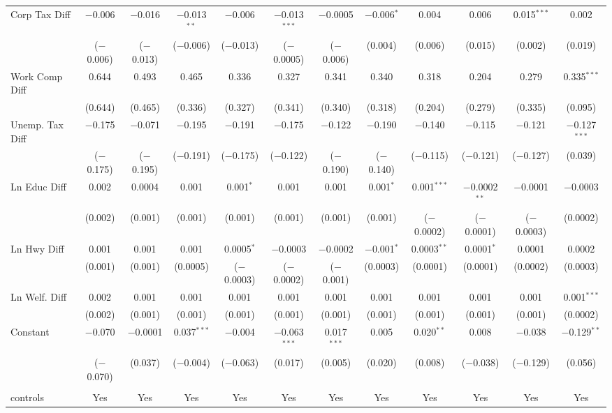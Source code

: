 \begin{table}[!htbp]
\begin{tabular}{@{\extracolsep{5pt}}lccccccccccc}
  Corp Tax Diff & $-$0.006 & $-$0.016 & $-$0.013$^{**}$ & $-$0.006 & $-$0.013$^{***}$ & $-$0.0005 & $-$0.006$^{*}$ & 0.004 & 0.006 & 0.015$^{***}$ & 0.002 \\ 
  & ($-$0.006) & ($-$0.013) & ($-$0.006) & ($-$0.013) & ($-$0.0005) & ($-$0.006) & (0.004) & (0.006) & (0.015) & (0.002) & (0.019) \\ 
  Work Comp Diff & 0.644 & 0.493 & 0.465 & 0.336 & 0.327 & 0.341 & 0.340 & 0.318 & 0.204 & 0.279 & 0.335$^{***}$ \\ 
  & (0.644) & (0.465) & (0.336) & (0.327) & (0.341) & (0.340) & (0.318) & (0.204) & (0.279) & (0.335) & (0.095) \\ 
  Unemp. Tax Diff & $-$0.175 & $-$0.071 & $-$0.195 & $-$0.191 & $-$0.175 & $-$0.122 & $-$0.190 & $-$0.140 & $-$0.115 & $-$0.121 & $-$0.127$^{***}$ \\ 
  & ($-$0.175) & ($-$0.195) & ($-$0.191) & ($-$0.175) & ($-$0.122) & ($-$0.190) & ($-$0.140) & ($-$0.115) & ($-$0.121) & ($-$0.127) & (0.039) \\ 
  Ln Educ Diff & 0.002 & 0.0004 & 0.001 & 0.001$^{*}$ & 0.001 & 0.001 & 0.001$^{*}$ & 0.001$^{***}$ & $-$0.0002$^{**}$ & $-$0.0001 & $-$0.0003 \\ 
  & (0.002) & (0.001) & (0.001) & (0.001) & (0.001) & (0.001) & (0.001) & ($-$0.0002) & ($-$0.0001) & ($-$0.0003) & (0.0002) \\ 
  Ln Hwy Diff & 0.001 & 0.001 & 0.001 & 0.0005$^{*}$ & $-$0.0003 & $-$0.0002 & $-$0.001$^{*}$ & 0.0003$^{**}$ & 0.0001$^{*}$ & 0.0001 & 0.0002 \\ 
  & (0.001) & (0.001) & (0.0005) & ($-$0.0003) & ($-$0.0002) & ($-$0.001) & (0.0003) & (0.0001) & (0.0001) & (0.0002) & (0.0003) \\ 
  Ln Welf. Diff & 0.002 & 0.001 & 0.001 & 0.001 & 0.001 & 0.001 & 0.001 & 0.001 & 0.001 & 0.001 & 0.001$^{***}$ \\ 
  & (0.002) & (0.001) & (0.001) & (0.001) & (0.001) & (0.001) & (0.001) & (0.001) & (0.001) & (0.001) & (0.0002) \\ 
  Constant & $-$0.070 & $-$0.0001 & 0.037$^{***}$ & $-$0.004 & $-$0.063$^{***}$ & 0.017$^{***}$ & 0.005 & 0.020$^{**}$ & 0.008 & $-$0.038 & $-$0.129$^{**}$ \\ 
  & ($-$0.070) & (0.037) & ($-$0.004) & ($-$0.063) & (0.017) & (0.005) & (0.020) & (0.008) & ($-$0.038) & ($-$0.129) & (0.056) \\ 
 \hline \\[-1.8ex] 
controls & Yes & Yes & Yes & Yes & Yes & Yes & Yes & Yes & Yes & Yes & Yes \\ 

\end{tabular}
\end{table}
